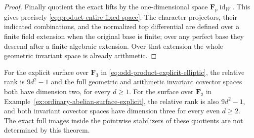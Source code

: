 \begin{proof}
Finally quotient the exact lifts by the one-dimensional
space $\mathbf F_p\operatorname{id}_W$.
This gives precisely \eqref{eq:product-entire-fixed-space}.
The character projectors, their indicated combinations,
and the normalized top differential are defined over
a finite field extension when the original base is
finite; over any perfect base they descend after a
finite algebraic extension.  Over that extension the
whole geometric invariant space is already arithmetic.
\end{proof}

\begin{corollary}\label{cor:product-two-explicit-fixed-spaces}
For the explicit surface over $\mathbf F_3$ in
\eqref{eq:odd-product-explicit-elliptic}, the relative
rank is $9d^2-1$ and the full geometric and arithmetic
invariant covector spaces both have dimension two,
for every $d\geq1$.
For the surface over $\mathbf F_2$ in
Example~\ref{ex:ordinary-abelian-surface-explicit}, the
relative rank is also $9d^2-1$, and both invariant
covector spaces have dimension three for every even
$d\geq2$.
The exact full images inside the pointwise stabilizers
of these quotients are not determined by this theorem.
\end{corollary}
